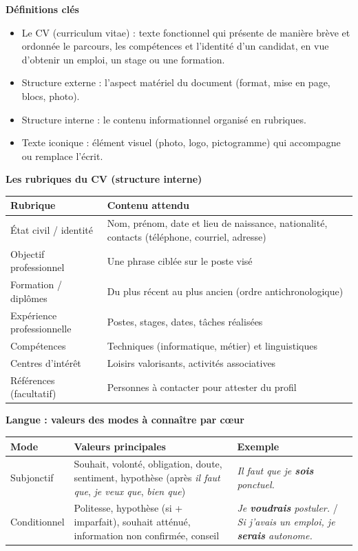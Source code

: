 \documentclass[11pt]{article}
\newcommand{\cle}[1]{{\popxbold\color{popdark}#1}}
\begin{document}
\begin{bilan}
\textbf{Définitions clés}
\begin{itemize}
\item Le \cle{CV} (curriculum vitae) : texte \cle{fonctionnel} qui présente de manière brève et ordonnée le parcours, les compétences et l'identité d'un candidat, en vue d'obtenir un emploi, un stage ou une formation.
\item \cle{Structure externe} : l'aspect matériel du document (format, mise en page, blocs, photo).
\item \cle{Structure interne} : le contenu informationnel organisé en rubriques.
\item Texte \cle{iconique} : élément visuel (photo, logo, pictogramme) qui accompagne ou remplace l'écrit.
\end{itemize}

\textbf{Les rubriques du CV (structure interne)}
\begin{center}
\begin{tabularx}{\linewidth}{|l|X|}\hline
\rowcolor{popblueL} \textbf{Rubrique} & \textbf{Contenu attendu} \\ \hline
État civil / identité & Nom, prénom, date et lieu de naissance, nationalité, contacts (téléphone, courriel, adresse) \\ \hline
Objectif professionnel & Une phrase ciblée sur le poste visé \\ \hline
Formation / diplômes & Du plus récent au plus ancien (ordre \cle{antichronologique}) \\ \hline
Expérience professionnelle & Postes, stages, dates, tâches réalisées \\ \hline
Compétences & Techniques (informatique, métier) et linguistiques \\ \hline
Centres d'intérêt & Loisirs valorisants, activités associatives \\ \hline
Références (facultatif) & Personnes à contacter pour attester du profil \\ \hline
\end{tabularx}
\end{center}

\textbf{Langue : valeurs des modes à connaître par cœur}
\begin{center}
\begin{tabularx}{\linewidth}{|l|X|X|}\hline
\rowcolor{popblueL} \textbf{Mode} & \textbf{Valeurs principales} & \textbf{Exemple} \\ \hline
Subjonctif & Souhait, volonté, obligation, doute, sentiment, hypothèse (après \emph{il faut que}, \emph{je veux que}, \emph{bien que}) & \emph{Il faut que je \textbf{sois} ponctuel.} \\ \hline
Conditionnel & Politesse, hypothèse (si + imparfait), souhait atténué, information non confirmée, conseil & \emph{Je \textbf{voudrais} postuler.} / \emph{Si j'avais un emploi, je \textbf{serais} autonome.} \\ \hline
\end{tabularx}
\end{center}


\end{bilan}
\end{document}
